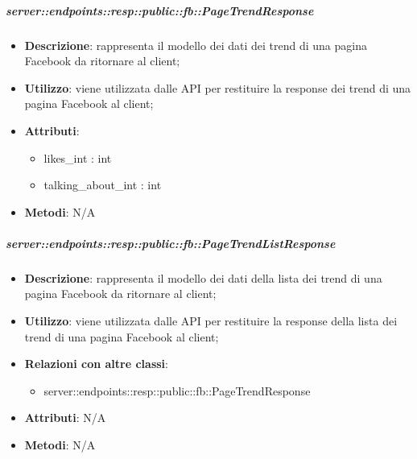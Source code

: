     \subparagraph{server::endpoints::resp::public::fb::PageTrendResponse} %
    \label{subp:bdsm_app_server_endpoints_resp_public_fb_pagetrendresponse}
    \begin{itemize}
      \item \textbf{Descrizione}: rappresenta il modello dei dati dei trend di una pagina Facebook da ritornare al client;
      \item \textbf{Utilizzo}: viene utilizzata dalle API per restituire la response dei trend di una pagina Facebook al client;
	  \item \textbf{Attributi}:  
	  	\begin{itemize}
	  		\item likes\_int : int
	  		\item talking\_about\_int : int
	  	\end{itemize}
	  \item \textbf{Metodi}: N/A
    \end{itemize}

    \subparagraph{server::endpoints::resp::public::fb::PageTrendListResponse} %
    \label{subp:bdsm_app_server_endpoints_resp_public_fb_pagetrendlistresponse}
    \begin{itemize}
      \item \textbf{Descrizione}: rappresenta il modello dei dati della lista dei trend di una pagina Facebook da ritornare al client;
      \item \textbf{Utilizzo}: viene utilizzata dalle API per restituire la response della lista dei trend di una pagina Facebook al client;
      \item \textbf{Relazioni con altre classi}:
        \begin{itemize}
          \item server::endpoints::resp::public::fb::PageTrendResponse
        \end{itemize}
	  \item \textbf{Attributi}: N/A
	  \item \textbf{Metodi}: N/A
      \end{itemize}

